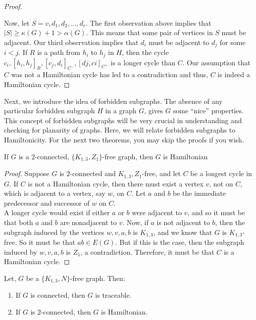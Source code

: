 \documentclass[../basic_graph_theory.tex]{subfiles}
\begin{document}
\begin{proof}
\begin{enumerate}
    \end{enumerate}
    Now, let $S = {v,d_1, d_2,...,d_r}$. The first observation above implies that $|S| \ge \kappa(G)+1 > \alpha(G)$. This means that some pair of vertices in $S$ must be adjacent. Our third observation implies that $d_i$ must be adjacent to $d_j$ for some $i<j$. If $R$ is a path from $h_i$ to $h_j$ in $H$, then the cycle $c_i, [h_i, h_j]_{R}, [c_j , d_i]_{C^-} , [dj , ci]_{C^+}$ is a longer cycle than $C$. Our assumption that $C$ was not a Hamiltonian cycle has led to a contradiction and thus, $C$ is indeed a Hamiltonian cycle.
\end{proof}

Next, we introduce the idea of forbidden subgraphs. The absence of any particular forbidden subgraph $H$ in a graph $G$, gives $G$ some ``nice'' properties. This concept of forbidden subgraphs will be very crucial in understanding and checking for planarity of graphs. Here, we will relate forbidden subgraphs to Hamiltonicity. For the next two theorems, you may skip the proofs if you wish.

\begin{thm}
    If $G$ is a $2$-connected, $\{K_{1,3}, Z_{1}\}$-free graph, then $G$ is Hamiltonian
\end{thm}
\begin{proof}
    Suppose $G$ is $2$-connected and ${K_{1,3}, Z_1}$-free, and let $C$ be a longest cycle in $G$. If $C$ is not a Hamiltonian cycle, then there must exist a vertex $v$, not on $C$, which is adjacent to a vertex, say $w$, on $C$. Let $a$ and $b$ be the immediate predecessor and successor of $w$ on $C$.\\
    A longer cycle would exist if either $a$ or $b$ were adjacent to $v$, and so it must be that both $a$ and $b$ are nonadjacent to $v$. Now, if $a$ is not adjacent to $b$, then the subgraph induced by the vertices ${w,v,a,b}$ is $K_{1,3}$, and we know that $G$ is $K_{1,3}$-free. So it must be that $ab \in E(G)$. But if this is the case, then the subgraph induced by ${w,v,a,b}$ is $Z_1$, a contradiction. Therefore, it must be that $C$ is a Hamiltonian cycle.
\end{proof}

\begin{thm}
    Let, $G$ be a $\{K_{1,3}, N\}$-free graph. Then:\\
    \begin{enumerate}
        \item If $G$ is connected, then $G$ is traceable.
        \item If $G$ is $2$-connected, then $G$ is Hamiltonian.
    \end{enumerate}
\end{thm}
\end{document}
